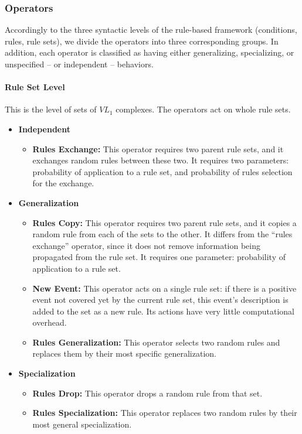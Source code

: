 \documentclass[../main.tex]{subfiles}
\begin{document}
\subsubsection{Operators}
Accordingly to the three syntactic levels of the rule-based framework (conditions, rules, rule sets), we divide the
operators into three corresponding groups. In addition, each operator is classified as having either generalizing,
specializing, or unspecified -- or independent -- behaviors.

\paragraph{Rule Set Level} This is the level of sets of $VL_1$ complexes. The operators act on whole rule sets.

\begin{itemize}
	\item \textbf{Independent}
	\begin{itemize}
		\item \textbf{Rules Exchange:} This operator requires two parent rule sets, and it exchanges random rules
		between these two. It requires two parameters: probability of application to a rule set, and probability of
		rules selection for the exchange.
	\end{itemize}
	\item \textbf{Generalization}
	\begin{itemize}
		\item \textbf{Rules Copy:} This operator requires two parent rule sets, and it copies a random rule from each
		of the sets to the other. It differs from the ``rules exchange'' operator, since it does not remove information
		being propagated from the rule set. It requires one parameter: probability of application to a rule set.
		\item \textbf{New Event:} This operator acts on a single rule set: if there is a positive event not covered yet
		by the current rule set, this event's description is added to the set as a new rule. Its actions have very
		little computational overhead.
		\item \textbf{Rules Generalization:} This operator selects two random rules and replaces them by their most
specific generalization.
	\end{itemize}
	\item \textbf{Specialization}
	\begin{itemize}
		\item \textbf{Rules Drop:} This operator drops a random rule from that set.
		\item \textbf{Rules Specialization:} This operator replaces two random rules
		by their most general specialization.
	\end{itemize}
\end{itemize}
\end{document}
